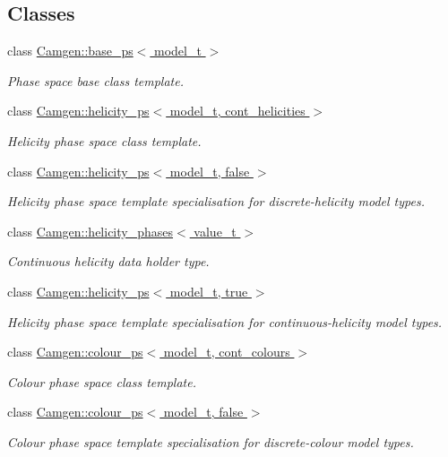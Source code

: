 \subsection*{Classes}
\begin{DoxyCompactItemize}
\item 
class \hyperlink{a00019}{Camgen\+::base\+\_\+ps$<$ model\+\_\+t $>$}
\begin{DoxyCompactList}\small\item\em Phase space base class template. \end{DoxyCompactList}\item 
class \hyperlink{a00276}{Camgen\+::helicity\+\_\+ps$<$ model\+\_\+t, cont\+\_\+helicities $>$}
\begin{DoxyCompactList}\small\item\em Helicity phase space class template. \end{DoxyCompactList}\item 
class \hyperlink{a00277}{Camgen\+::helicity\+\_\+ps$<$ model\+\_\+t, false $>$}
\begin{DoxyCompactList}\small\item\em Helicity phase space template specialisation for discrete-\/helicity model types. \end{DoxyCompactList}\item 
class \hyperlink{a00275}{Camgen\+::helicity\+\_\+phases$<$ value\+\_\+t $>$}
\begin{DoxyCompactList}\small\item\em Continuous helicity data holder type. \end{DoxyCompactList}\item 
class \hyperlink{a00278}{Camgen\+::helicity\+\_\+ps$<$ model\+\_\+t, true $>$}
\begin{DoxyCompactList}\small\item\em Helicity phase space template specialisation for continuous-\/helicity model types. \end{DoxyCompactList}\item 
class \hyperlink{a00084}{Camgen\+::colour\+\_\+ps$<$ model\+\_\+t, cont\+\_\+colours $>$}
\begin{DoxyCompactList}\small\item\em Colour phase space class template. \end{DoxyCompactList}\item 
class \hyperlink{a00085}{Camgen\+::colour\+\_\+ps$<$ model\+\_\+t, false $>$}
\begin{DoxyCompactList}\small\item\em Colour phase space template specialisation for discrete-\/colour model types. \end{DoxyCompactList}\item 

\end{DoxyCompactItemize}
